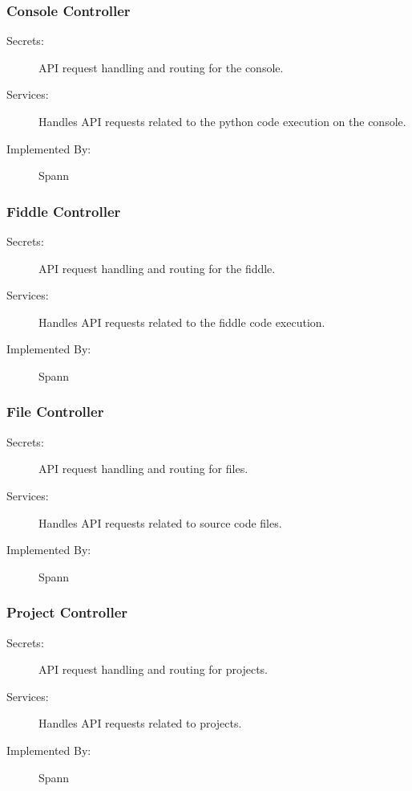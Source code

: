 \documentclass[12pt, titlepage]{article}
\begin{document}
\subsubsection{Console Controller}

\begin{description}
\item[Secrets:] API request handling and routing for the console.
\item[Services:] Handles API requests related to the python code execution on
    the console.
\item[Implemented By:] Spann
\end{description}

\subsubsection{Fiddle Controller}

\begin{description}
\item[Secrets:] API request handling and routing for the fiddle.
\item[Services:] Handles API requests related to the fiddle code execution.
\item[Implemented By:] Spann
\end{description}

\subsubsection{File Controller}

\begin{description}
\item[Secrets:] API request handling and routing for files.
\item[Services:] Handles API requests related to source code files.
\item[Implemented By:] Spann
\end{description}

\subsubsection{Project Controller}

\begin{description}
\item[Secrets:] API request handling and routing for projects.
\item[Services:] Handles API requests related to projects.
\item[Implemented By:] Spann
\end{description}
\end{document}
